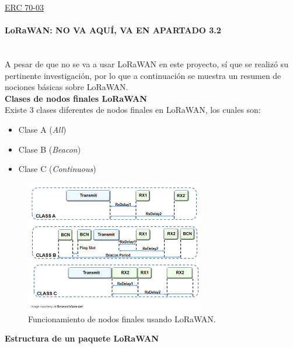 \documentclass[12pt]{article}
\newcommand{\subsubsubsection}[1]{\paragraph{#1}\mbox{}\\}
\begin{document}
	\noindent \href{https://docdb.cept.org/download/25c41779-cd6e/Rec7003e.pdf}{ERC 70-03} \\
	
	
	\pagebreak
	
	\subsubsubsection{LoRaWAN: NO VA AQUÍ, VA EN APARTADO 3.2}
	
	\noindent A pesar de que no se va a usar LoRaWAN en este proyecto, sí que se realizó su pertinente investigación, por lo que a continuación se muestra un resumen de nociones básicas sobre LoRaWAN. \\
	
	\noindent \textbf{Clases de nodos finales LoRaWAN}  \\
	
	\noindent Existe 3 clases diferentes de nodos finales en LoRaWAN, los cuales son:
	
	\begin{itemize}
		\item Clase A (\textit{All})
		\item Clase B (\textit{Beacon})
		\item Clase C (\textit{Continuous})
	\end{itemize}
	
		\begin{figure}[h]
		\begin{center}
			\includegraphics[width=0.7\textwidth]{img/endDevices.png}
			\caption{Funcionamiento de nodos finales usando LoRaWAN.}
		\end{center}
	\end{figure}
	
	\pagebreak
	
	\noindent \textbf{Estructura de un paquete LoRaWAN}
	
\end{document}

